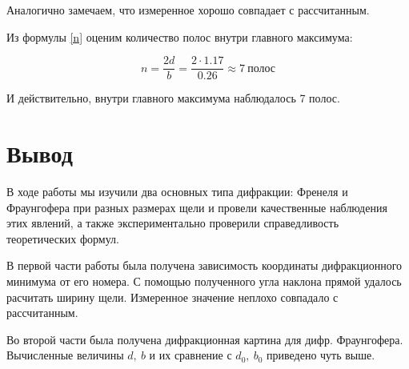  Аналогично замечаем, что измеренное хорошо совпадает с рассчитанным.
 
 Из формулы \eqref{n} оценим количество полос внутри главного максимума:
 
 \[ n = \frac{2d}{b} = \frac{2 \cdot 1.17}{0.26}  \approx 7 \: \text{полос}   \] 
 
И действительно, внутри главного максимума наблюдалось 7 полос.
 
 \section{Вывод}
 
 В ходе работы мы изучили два основных типа дифракции: Френеля и Фраунгофера при разных размерах щели и провели качественные наблюдения этих явлений, а также экспериментально проверили справедливость теоретических формул.  
 
 В первой части работы была получена зависимость координаты дифракционного минимума от его номера. 
 С помощью полученного угла наклона прямой удалось расчитать ширину щели. Измеренное значение неплохо совпадало с рассчитанным.
 
Во второй части была получена дифракционная картина для дифр. Фраунгофера. Вычисленные величины $d, \: b$ и их сравнение с $d_0, \: b_0$ приведено чуть выше.

